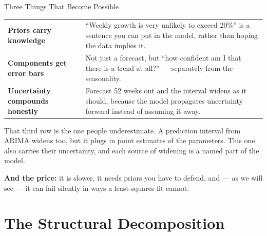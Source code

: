 \documentclass[aspectratio=169, 11pt]{beamer}
\begin{document}
\begin{frame}{Three Things That Become Possible}
  \begin{center}
    {\small
    \begin{tabular}{p{3.5cm}p{8.8cm}}
      \toprule
      \textbf{Priors carry knowledge} & ``Weekly growth is very unlikely to exceed 20\%'' is a
      sentence you can put in the model, rather than hoping the data implies it. \\[3pt]
      \textbf{Components get error bars} & Not just a forecast, but ``how confident am I that
      there is a trend at all?'' --- separately from the seasonality. \\[3pt]
      \textbf{Uncertainty compounds honestly} & Forecast 52 weeks out and the interval widens as
      it should, because the model propagates uncertainty forward instead of assuming it away. \\
      \bottomrule
    \end{tabular}
    }
  \end{center}

  \vspace{0.1cm}
  That third row is the one people underestimate. A prediction interval from ARIMA widens too,
  but it plugs in point estimates of the parameters. This one also carries their uncertainty, and
  each source of widening is a named part of the model.

  \vspace{0.15cm}
  \textbf{And the price:} it is slower, it needs priors you have to defend, and --- as we will
  see --- it can fail silently in ways a least-squares fit cannot.
\end{frame}

\section{The Structural Decomposition}

\end{document}
